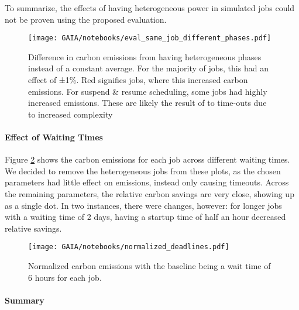 To summarize, the effects of having heterogeneous power in simulated jobs could not be proven using the proposed evaluation.

\begin{figure}
    \texttt{[image: GAIA/notebooks/eval\_same\_job\_different\_phases.pdf]}
    \caption[short]{Difference in carbon emissions from having heterogeneous phases instead of a constant average. For the majority of jobs, this had an effect of ±1\%. Red signifies jobs, where this increased carbon emissions. For suspend \& resume scheduling, some jobs had highly increased emissions. These are likely the result of to time-outs due to increased complexity}

    \label{fig:different_phases_no_effect_lol}
\end{figure}

\paragraph{Effect of Waiting Times}

Figure \ref{fig:different_deadlines_normalized} shows the carbon emissions for each job across different waiting times.
We decided to remove the heterogeneous jobs from these plots, as the chosen parameters had little effect on emissions, instead only causing timeouts. 
Across the remaining parameters, the relative carbon savings are very close, showing up as a single dot.
In two instances, there were changes, however: for longer jobs with a waiting time of 2 days, having a startup time of half an hour decreased relative savings. 

% 

\begin{figure}
    \texttt{[image: GAIA/notebooks/normalized\_deadlines.pdf]}
    \caption[short]{Normalized carbon emissions with the baseline being a wait time of 6 hours for each job. }

    \label{fig:different_deadlines_normalized}
\end{figure}

\paragraph{Summary}


